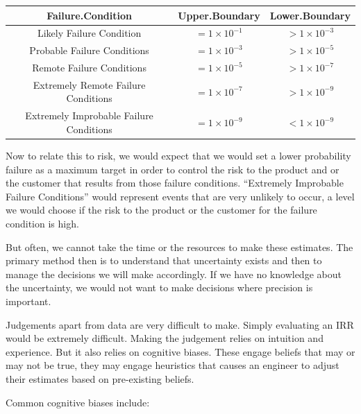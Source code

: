 \documentclass[
]{article}
\begin{document}
\begin{tabular}{c|c|c}
\hline
Failure.Condition & Upper.Boundary & Lower.Boundary\\
\hline
Likely Failure Condition & $= 1 \times 10^{-1}$ & $> 1 \times 10^{-3}$\\
\hline
Probable Failure Conditions & $= 1 \times 10^{-3}$ & $> 1 \times 10^{-5}$\\
\hline
Remote Failure Conditions & $= 1 \times 10^{-5}$ & $> 1 \times 10^{-7}$\\
\hline
Extremely Remote Failure Conditions & $= 1 \times 10^{-7}$ & $> 1 \times 10^{-9}$\\
\hline
Extremely Improbable Failure Conditions & $= 1 \times 10^{-9}$ & $< 1 \times 10^{-9}$\\
\hline
\end{tabular}

Now to relate this to risk, we would expect that we would set a lower probability failure as a maximum target in order to control the risk to the product and or the customer that results from those failure conditions. ``Extremely Improbable Failure Conditions'' would represent events that are very unlikely to occur, a level we would choose if the risk to the product or the customer for the failure condition is high.

But often, we cannot take the time or the resources to make these estimates. The primary method then is to understand that uncertainty exists and then to manage the decisions we will make accordingly. If we have no knowledge about the uncertainty, we would not want to make decisions where precision is important.

Judgements apart from data are very difficult to make. Simply evaluating an IRR would be extremely difficult. Making the judgement relies on intuition and experience. But it also relies on cognitive biases. These engage beliefs that may or may not be true, they may engage heuristics that causes an engineer to adjust their estimates based on pre-existing beliefs.

Common cognitive biases include:
\end{document}
